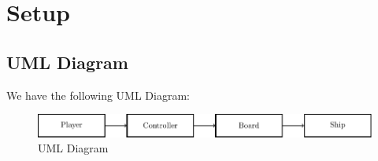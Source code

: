 \section{Setup}

\subsection{UML Diagram}
We have the following UML Diagram:
\begin{figure}[H]
	\centering
	\includegraphics[width=0.9\linewidth]{Diagrams/UMLDiagram}
	\caption{UML Diagram}
\end{figure}


